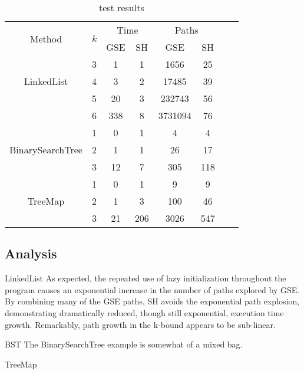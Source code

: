 \begin{table} [h]
  \centering
  \begin{tabular}{| c | c | c | c | c | c | c | c |}
  \hline
   \multirow{2}{*}{Method }&\multirow{2}{*}{ $k$ }
   &\multicolumn{2}{|c|}{Time} &\multicolumn{2}{|c|}{ Paths }\\
								&	&GSE	&SH	&GSE & SH\\
   \hline
    \multirow{3}{*}{LinkedList }&3	& 1 & 1  &1656 & 25		 \\
   		 				& 4	& 3 & 2	&17485  & 39 \\
   						& 5	& 20 & 3	&232743 & 56\\
						& 6	& 338 & 8		&3731094 & 76\\
    \hline
    \multirow{3}{*}{BinarySearchTree }&1	& 0 & 1	& 4	 & 4\\
   		 				& 2	& 1 & 1 	& 26 & 17\\
   						& 3	& 12 & 7	& 305 & 118\\
    \hline
      \multirow{3}{*}{TreeMap}&1	& 0 & 1 	&9 & 9 \\
   		 				&2	& 1 & 3		& 100 & 46 \\
   						&3	&21 & 206	& 3026 & 547 \\
						
    \hline
  \end{tabular}
  \caption{test results}
  \label{tab:results}
\end{table}

\subsection{Analysis}

LinkedList
As expected, the repeated use of lazy initialization throughout the program causes an exponential increase in the number of paths explored by GSE. By combining many of the GSE paths, SH avoids the exponential path explosion, demonstrating dramatically reduced, though still exponential, execution time growth. Remarkably, path growth in the k-bound appears to be sub-linear.

BST
The BinarySearchTree example is somewhat of a mixed bag. 

TreeMap

